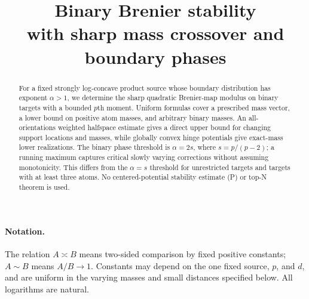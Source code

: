 
\title{Binary Brenier stability\\with sharp mass crossover and boundary phases}

\maketitle
\begin{abstract}
For a fixed strongly log-concave product source whose boundary distribution has exponent $\alpha>1$, we determine the sharp quadratic Brenier-map modulus on binary targets with a bounded $p$th moment. Uniform formulas cover a prescribed mass vector, a lower bound on positive atom masses, and arbitrary binary masses. An all-orientations weighted halfspace estimate gives a direct upper bound for changing support locations and masses, while globally convex hinge potentials give exact-mass lower realizations. The binary phase threshold is $\alpha=2s$, where $s=p/(p-2)$; a running maximum captures critical slowly varying corrections without assuming monotonicity. This differs from the $\alpha=s$ threshold for unrestricted targets and targets with at least three atoms. No centered-potential stability estimate (P) or top-N theorem is used.
\end{abstract}
\SourceNote
\paragraph{Notation.} The relation $A\asymp B$ means two-sided comparison by fixed positive constants; $A\sim B$ means $A/B\to1$. Constants may depend on the one fixed source, $p$, and $d$, and are uniform in the varying masses and small distances specified below. All logarithms are natural.


